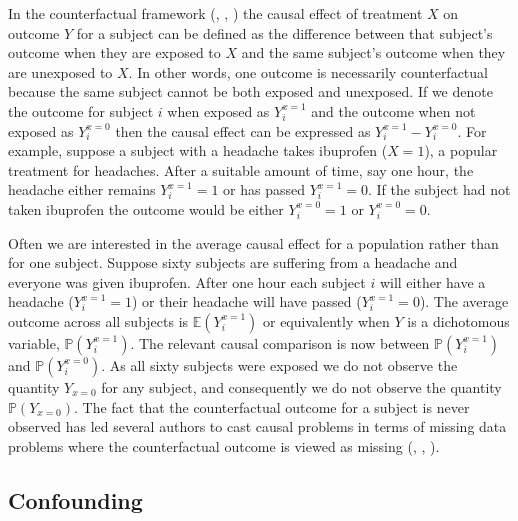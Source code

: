 \documentclass[11pt]{article}
\begin{document}
In the counterfactual framework (\citet{Neyman1923}, \citet{Rubin1978},
\citet{Robins1986}) the causal effect of treatment \(X\) on outcome
\(Y\) for a subject can be defined as the difference between that
subject's outcome when they are exposed to \(X\) and the same subject's
outcome when they are unexposed to \(X\). In other words, one outcome is
necessarily counterfactual because the same subject cannot be both
exposed and unexposed. If we denote the outcome for subject \(i\) when
exposed as \(Y_{i}^{x=1}\) and the outcome when not exposed as
\(Y_{i}^{x=0}\) then the causal effect can be expressed as
\(Y_{i}^{x=1} - Y_{i}^{x=0}\). For example, suppose a subject with a
headache takes ibuprofen (\(X = 1\)), a popular treatment for headaches.
After a suitable amount of time, say one hour, the headache either
remains \(Y_{i}^{x=1} = 1\) or has passed \(Y_{i}^{x=1} = 0\). If the
subject had not taken ibuprofen the outcome would be either
\(Y_{i}^{x=0} = 1\) or \(Y_{i}^{x=0} = 0\). \linebreak

Often we are interested in the average causal effect for a population
rather than for one subject. Suppose sixty subjects are suffering from a
headache and everyone was given ibuprofen. After one hour each subject
\(i\) will either have a headache (\(Y_{i}^{x=1}=1\)) or their headache
will have passed (\(Y_{i}^{x=1}=0\)). The average outcome across all
subjects is \(\mathbb{E}(Y_{i}^{x = 1})\) or equivalently when \(Y\) is
a dichotomous variable, \(\mathbb{P}(Y_{i}^{x = 1})\). The relevant
causal comparison is now between \(\mathbb{P}(Y_{i}^{x = 1})\) and
\(\mathbb{P}(Y_{i}^{x = 0})\). As all sixty subjects were exposed we do
not observe the quantity \(Y_{x=0}\) for any subject, and consequently
we do not observe the quantity \(\mathbb{P}(Y_{x = 0})\). The fact that
the counterfactual outcome for a subject is never observed has led
several authors to cast causal problems in terms of missing data
problems where the counterfactual outcome is viewed as missing
(\citet{Ding2017}, \citet{Howe2015}, \citet{Edwards2015}). \linebreak

    \subsection{Confounding}\label{confounding}
\end{document}
